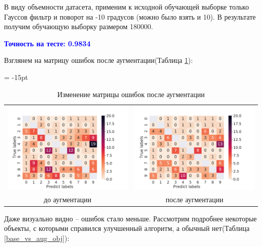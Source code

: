 \documentclass[12pt,fleqn]{article}
\begin{document}
В виду объемности датасета, применим к исходной обучающей выборке только Гауссов фильтр и поворот на -10 градусов (можно было взять и 10).
В результате получим обучающую выборку размером 180000.

\newpage
\textcolor{blue}{\textbf{Точность на тесте: 0.9834}}

Взглянем на матрицу ошибок после аугментации(Таблица \ref{conf_matrix_aug}):

\begin{table}[htb]
    \centering
    \tabcolsep = -15pt
    \begin{tabular}{cc}
        \includegraphics[width=10cm]{task4.pdf} & \includegraphics[width=10cm]{task5_conf_mat.pdf}\\
        до аугментации & после аугментации 
    \end{tabular}
    \caption{Изменение матрицы ошибок после аугментации}
    \label{conf_matrix_aug}
\end{table}

Даже визуально видно -- ошибок стало меньше. Рассмотрим подробнее некоторые объекты, 
с которыми справился улучшенный алгоритм, а обычный нет(Таблица \ref{base_vs_aug_obj}):
\end{document}
